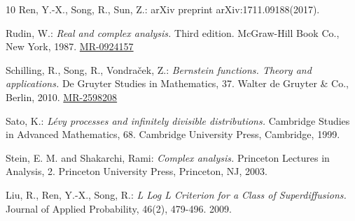 \documentclass[12pt,oneside,english]{amsart}
\def\MR#1{\href{http://www.ams.org/mathscinet-getitem?mr=#1}{MR-#1}}
\theoremstyle{plain}
\theoremstyle{definition}
\numberwithin{equation}{section}
\begin{document}
\begin{thebibliography} {10}
Ren, Y.-X., Song, R., Sun, Z.:
 arXiv preprint arXiv:1711.09188(2017).

Rudin, W.:
\emph{Real and complex analysis.}
Third edition. McGraw-Hill Book Co., New York, 1987.
\MR{0924157}

Schilling, R., Song, R., Vondra\v{c}ek, Z.:
\emph{Bernstein functions. Theory and applications.}
De Gruyter Studies in Mathematics, 37. Walter de Gruyter \& Co., Berlin, 2010.
\MR{2598208}


Sato, K.:
\emph{Lévy processes and infinitely divisible distributions.}
Cambridge Studies in Advanced Mathematics, 68. Cambridge University Press, Cambridge, 1999.

Stein, E. M. and Shakarchi, Rami:
\emph{Complex analysis.}
Princeton Lectures in Analysis, 2. Princeton University Press, Princeton, NJ, 2003.

Liu, R.,  Ren, Y.-X., Song, R.:
\emph{ L Log L Criterion for a Class of Superdiffusions.}
Journal of Applied Probability, 46(2), 479-496. 2009.

\end{thebibliography}
\end{document}
